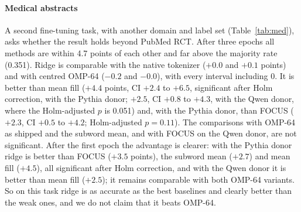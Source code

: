 \documentclass[preprint,12pt]{elsarticle}
\begin{document}
\paragraph{Medical abstracts} A second fine-tuning task, with another domain and label set (Table~\ref{tab:med}), asks whether the result holds beyond PubMed RCT. After three epochs all methods are within 4.7 points of each other and far above the majority rate (0.351). Ridge is comparable with the native tokenizer ($+0.0$ and $+0.1$ points) and with centred OMP-64 ($-0.2$ and $-0.0$), with every interval including 0. It is better than mean fill ($+4.4$ points, CI $+2.4$ to $+6.5$, significant after Holm correction, with the Pythia donor; $+2.5$, CI $+0.8$ to $+4.3$, with the Qwen donor, where the Holm-adjusted $p$ is 0.051) and, with the Pythia donor, than FOCUS ($+2.3$, CI $+0.5$ to $+4.2$; Holm-adjusted $p=0.11$). The comparisons with OMP-64 as shipped and the subword mean, and with FOCUS on the Qwen donor, are not significant. After the first epoch the advantage is clearer: with the Pythia donor ridge is better than FOCUS ($+3.5$ points), the subword mean ($+2.7$) and mean fill ($+4.5$), all significant after Holm correction, and with the Qwen donor it is better than mean fill ($+2.5$); it remains comparable with both OMP-64 variants. So on this task ridge is as accurate as the best baselines and clearly better than the weak ones, and we do not claim that it beats OMP-64.
\begin{table}[t]
\centering\small
\caption{Medical abstracts: test accuracy (\%) after fine-tuning the transplanted GPT-2 for 3 epochs (mean $\pm$ sd over 3 seeds) and ridge minus each method in percentage points, with the 95\,\% interval of a paired bootstrap over the 1000 test abstracts (per-abstract correctness averaged over seeds, 100\,000 resamples). $^{*}$ interval excludes 0; $^{\dagger}$ significant after Holm correction over the 10 comparisons of this epoch. The native tokenizer is a reference and is not in the correction. Majority-class accuracy is 35.1\,\%.}
\label{tab:med}
\resizebox{\textwidth}{!}{}
\end{table}
\end{document}
